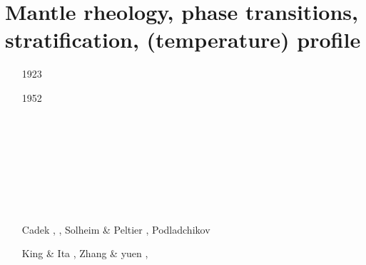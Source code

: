 \section{Mantle rheology, phase transitions, stratification, (temperature) profile}

\begin{scriptsize}
\begin{itemize}
\item[1923] 
\textcite{wiad23} 
\item[1952] 
\textcite{birc52} 
\item[\nineteenseventysix] 
\textcite{ocon76} 
\item[\nineteenseventyseven] 
\cite{stac77}
\item[\nineteeneightytwo] 
\cite{yusb82}
\cite{chri82}
\item[\nineteeneightyfive] 
\cite{chyu85}
\item[\nineteeneightysix] 
\cite{yuen86} 
\item[\nineteeneightynine] 
\cite{itka89} 
\item[\nineteenninetyone] 
\cite{fopd91} 
\item[\nineteenninetytwo] 
\cite{zhyh92} 
\cite{zhyh92}
\item[\nineteenninetythree] 
\cite{tasg93} \cite{tasg93}\\  
\cite{best93} \cite{best93}\\
\cite{kief93} \cite{kief93}\\
\cite{styz93} \cite{styz93}\\
\cite{yucc93} \cite{yucc93}\\
\cite{hoby93} \cite{hoby93}\\
\cite{dayu93} \cite{dayu93}\\
\item[\nineteenninetyfour] Cadek \etal \cite{cays94}, \cite{vayv94}
                    \cite{zhgu94b}\cite{styu94}, Solheim \& Peltier \cite{sope94},
                    Podladchikov \etal \cite{popy94}
\item[\nineteenninetyfive] King \& Ita \cite{kiit95}, Zhang \& yuen \cite{zhyu95}, 

\end{itemize}
\end{scriptsize}
